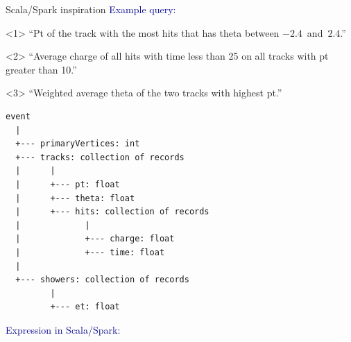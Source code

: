 \documentclass{beamer}
\begin{document}
\begin{frame}[fragile]{Scala/Spark inspiration}
\vspace{0.35 cm}
\small
\textcolor{darkblue}{Example query:}

\begin{onlyenv}<1>
``Pt of the track with the most hits that has theta between \mbox{$-2.4$ and $2.4$.''\hspace{-1 cm}}
\end{onlyenv}
\begin{onlyenv}<2>
``Average charge of all hits with time less than 25 on all tracks with pt greater than 10.''
\end{onlyenv}
\begin{onlyenv}<3>
``Weighted average theta of the two tracks with highest pt.''
\end{onlyenv}

\begin{center}
\begin{minipage}{0.5\linewidth}
{\tiny
\begin{verbatim}
event
  |
  +--- primaryVertices: int
  +--- tracks: collection of records
  |      |
  |      +--- pt: float
  |      +--- theta: float
  |      +--- hits: collection of records
  |             |
  |             +--- charge: float
  |             +--- time: float
  |
  +--- showers: collection of records
         |
         +--- et: float
\end{verbatim}}
\end{minipage}
\end{center}

\textcolor{darkblue}{Expression in Scala/Spark:}


\end{frame}
\end{document}

